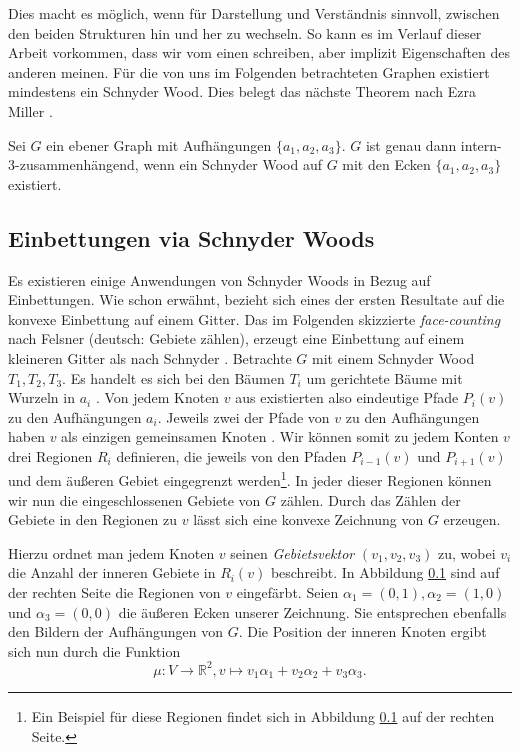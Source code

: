 Dies macht es möglich, wenn für Darstellung und Verständnis sinnvoll, zwischen den beiden Strukturen hin und her zu wechseln. So kann es im Verlauf dieser Arbeit vorkommen, dass wir vom einen schreiben, aber implizit Eigenschaften des anderen meinen. Für die von uns im Folgenden betrachteten Graphen existiert mindestens ein Schnyder Wood. Dies belegt das nächste Theorem nach Ezra Miller \cite[Theorem A]{miller02}.

\begin{theorem}
Sei $G$ ein ebener Graph mit Aufhängungen $\{a_1,a_2,a_3\}$. $G$ ist genau dann intern-3-zusammenhängend, wenn ein Schnyder Wood auf $G$ mit den Ecken $\{a_1,a_2,a_3\}$ existiert.
\end{theorem}

\subsection{Einbettungen via Schnyder Woods}\label{face_counting}

Es existieren einige Anwendungen von Schnyder Woods in Bezug auf Einbettungen. Wie schon erwähnt, bezieht sich eines der ersten Resultate auf die konvexe Einbettung auf einem Gitter. Das im Folgenden skizzierte \textit{face-counting} nach Felsner (deutsch: Gebiete zählen), erzeugt eine Einbettung auf einem kleineren Gitter als nach Schnyder \cite{felsner01}. Betrachte $G$ mit einem Schnyder Wood $T_1,T_2,T_3$. Es handelt es sich bei den Bäumen $T_i$ um gerichtete Bäume mit Wurzeln in $a_i$ \cite[Korollar 2.5]{felsner04}. Von jedem Knoten $v$ aus existierten also eindeutige Pfade $P_i(v)$ zu den Aufhängungen $a_i$. Jeweils zwei der Pfade von $v$ zu den Aufhängungen haben $v$ als einzigen gemeinsamen Knoten \cite[Lemma 2.4]{felsner04}. Wir können somit zu jedem Konten $v$ drei Regionen $R_i$ definieren, die jeweils von den Pfaden $P_{i-1}(v)$ und $P_{i+1}(v)$ und dem äußeren Gebiet eingegrenzt werden\footnote{Ein Beispiel für diese Regionen findet sich in Abbildung \ref{face_counting} auf der rechten Seite.}. In jeder dieser Regionen können wir nun die eingeschlossenen Gebiete von $G$ zählen. Durch das Zählen der Gebiete in den Regionen zu $v$ lässt sich eine konvexe Zeichnung von $G$ erzeugen.

Hierzu ordnet man jedem Knoten $v$ seinen \textit{Gebietsvektor} $(v_1,v_2,v_3)$ zu, wobei $v_i$ die Anzahl der inneren Gebiete in $R_i(v)$ beschreibt. In Abbildung \ref{face_counting} sind auf der rechten Seite die Regionen von $v$ eingefärbt. Seien $\alpha_1 = (0,1),\alpha_2 = (1,0)$ und $\alpha_3 = (0,0)$ die äußeren Ecken unserer Zeichnung. Sie entsprechen ebenfalls den Bildern der Aufhängungen von $G$. Die Position der inneren Knoten ergibt sich nun durch die Funktion 
$$\mu: V \to \mathbb{R}^2,v\mapsto v_1\alpha_1 + v_2\alpha_2+v_3\alpha_3.$$ 

